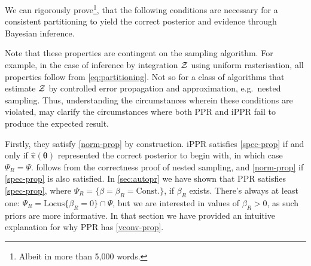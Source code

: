 \documentclass[usenatbib]{mnras}
\begin{document}
We can rigorously prove\footnote{Albeit in more than 5,000 words.},
that the following conditions are necessary for a consistent
partitioning to yield the correct posterior and evidence through
Bayesian inference.
Note that these properties are contingent on the sampling
algorithm. For example, in the case of inference by integration
${\cal Z}$ using uniform rasterisation, all properties follow from
\cref{eq:partitioning}. Not so for a class of algorithms that estimate
${\cal Z}$ by controlled error propagation and approximation,
e.g.~nested sampling. Thus, understanding the circumstances wherein
these conditions are violated, may clarify the circumstances where
both PPR and iPPR fail to produce the expected result.

Firstly, they satisfy \cref{norm-prop} by construction. iPPR satisfies
\cref{spec-prop} if and only if \( \hat{\pi} (\bm{\theta})\)
represented the correct posterior to begin with, in which case
$\Psi_{R} = \Psi$.  follows from the correctness
proof of nested sampling, \citep{Skilling2006} and \cref{norm-prop} if
\cref{spec-prop} is also satisfied. In \cref{sec:autopr} we have shown
that PPR satisfies \cref{spec-prop}, where
$\Psi_{R} = \{ \beta = \beta_{R} = \text{Const.}\}$, if $\beta_{R}$
exists. There's always at least one:
$\Psi_{R} = \text{Locus}\{ \beta_{R}=0 \} \cap \Psi$, but we are
interested in values of $\beta_{R} > 0$, as such priors are more
informative. In that section we have provided an intuitive explanation
for why PPR has \cref{vconv-prop}.
\end{document}
